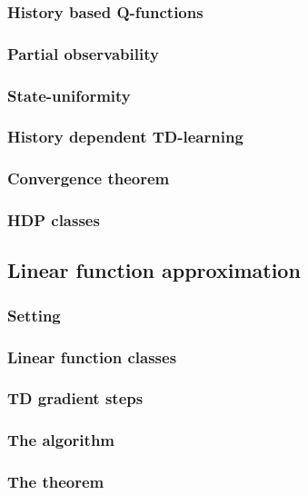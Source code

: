 \documentclass{beamer}[10]
\begin{document}
\begin{frame}
  \frametitle{History based Q-functions}

\end{frame}

\begin{frame}
  \frametitle{Partial observability}

\end{frame}

\begin{frame}
  \frametitle{State-uniformity}

\end{frame}

\begin{frame}
  \frametitle{History dependent TD-learning}

\end{frame}

\begin{frame}
  \frametitle{Convergence theorem}

\end{frame}

\begin{frame}
  \frametitle{HDP classes}

\end{frame}

\subsection{Linear function approximation}

\begin{frame}
  \frametitle{Setting}

\end{frame}

\begin{frame}
  \frametitle{Linear function classes}

\end{frame}

\begin{frame}
  \frametitle{TD gradient steps}

\end{frame}

\begin{frame}
  \frametitle{The algorithm}

\end{frame}

\begin{frame}
  \frametitle{The theorem}

\end{frame}
\end{document}

